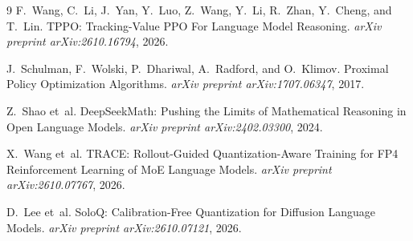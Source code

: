 \documentclass[11pt,a4paper]{article}
\begin{document}
\begin{thebibliography}{9}
F.~Wang, C.~Li, J.~Yan, Y.~Luo, Z.~Wang, Y.~Li, R.~Zhan, Y.~Cheng, and T.~Lin.
\newblock TPPO: Tracking-Value PPO For Language Model Reasoning.
\newblock \emph{arXiv preprint arXiv:2610.16794}, 2026.

J.~Schulman, F.~Wolski, P.~Dhariwal, A.~Radford, and O.~Klimov.
\newblock Proximal Policy Optimization Algorithms.
\newblock \emph{arXiv preprint arXiv:1707.06347}, 2017.

Z.~Shao et~al.
\newblock DeepSeekMath: Pushing the Limits of Mathematical Reasoning in Open Language Models.
\newblock \emph{arXiv preprint arXiv:2402.03300}, 2024.

X.~Wang et~al.
\newblock TRACE: Rollout-Guided Quantization-Aware Training for FP4 Reinforcement Learning of MoE Language Models.
\newblock \emph{arXiv preprint arXiv:2610.07767}, 2026.

D.~Lee et~al.
\newblock SoloQ: Calibration-Free Quantization for Diffusion Language Models.
\newblock \emph{arXiv preprint arXiv:2610.07121}, 2026.
\end{thebibliography}
\end{document}

